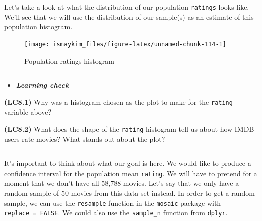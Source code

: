\documentclass[]{tufte-book}
\newenvironment{Shaded}{\begin{snugshade}}{\end{snugshade}}
\newcommand{\KeywordTok}[1]{\textcolor[rgb]{0.13,0.29,0.53}{\textbf{{#1}}}}
\newcommand{\DataTypeTok}[1]{\textcolor[rgb]{0.13,0.29,0.53}{{#1}}}
\newcommand{\DecValTok}[1]{\textcolor[rgb]{0.00,0.00,0.81}{{#1}}}
\newcommand{\StringTok}[1]{\textcolor[rgb]{0.31,0.60,0.02}{{#1}}}
\newcommand{\NormalTok}[1]{{#1}}
\let\oldrule=\rule
\renewcommand{\rule}[1]{\oldrule{\linewidth}}
\newenvironment{rmdblock}[1]
  {\begin{shaded*}
  \begin{itemize}
  \renewcommand{\labelitemi}{
    \raisebox{-.7\height}[0pt][0pt]{
    }
  }
  \item
  }
  {
  \end{itemize}
  \end{shaded*}
  }
\newenvironment{learncheck}
  {\begin{rmdblock}{warning}}
  {\end{rmdblock}}
\begin{document}
Let's take a look at what the distribution of our population
\texttt{ratings} looks like. We'll see that we will use the distribution
of our sample(s) as an estimate of this population histogram.

\begin{Shaded}
\end{Shaded}

\begin{figure}

{\centering \texttt{[image: ismaykim\_files/figure-latex/unnamed-chunk-114-1]} 

}

\caption[Population ratings histogram]{Population ratings histogram}\label{fig:unnamed-chunk-114}
\end{figure}

\begin{center}\rule{0.5\linewidth}{\linethickness}\end{center}

\begin{learncheck}
\textbf{\emph{Learning check}}
\end{learncheck}

\textbf{(LC8.1)} Why was a histogram chosen as the plot to make for the
\texttt{rating} variable above?

\textbf{(LC8.2)} What does the shape of the \texttt{rating} histogram
tell us about how IMDB users rate movies? What stands out about the
plot?

\begin{center}\rule{0.5\linewidth}{\linethickness}\end{center}

It's important to think about what our goal is here. We would like to
produce a confidence interval for the population mean \texttt{rating}.
We will have to pretend for a moment that we don't have all 58,788
movies. Let's say that we only have a random sample of 50 movies from
this data set instead. In order to get a random sample, we can use the
\texttt{resample} function in the \texttt{mosaic} package with
\texttt{replace\ =\ FALSE}. We could also use the \texttt{sample\_n}
function from \texttt{dplyr}.
\end{document}
